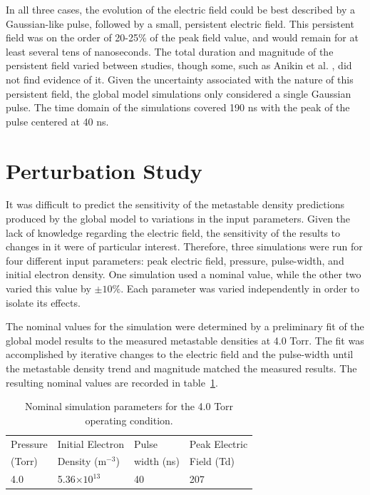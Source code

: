 In all three cases, the evolution of the electric field could be best described
by a Gaussian-like pulse, followed by a small, persistent electric field. This
persistent field was on the order of 20-25\% of the peak field value, and would
remain for at least several tens of nanoseconds. The total duration and
magnitude of the persistent field varied between studies, though some, such as
Anikin et al. \cite{Anikin1998}, did not find evidence of it. Given the
uncertainty associated with the nature of this persistent field, the global
model simulations only considered a single Gaussian pulse. The time domain of
the simulations covered 190 ns with the peak of the pulse centered at 40 ns.

\section{Perturbation Study}

It was difficult to predict the sensitivity of the metastable density
predictions produced by the global model to variations in the input parameters.
Given the lack of knowledge regarding the electric field, the sensitivity of the
results to changes in it were of particular interest. Therefore, three
simulations were run for four different input parameters: peak electric field,
pressure, pulse-width, and initial electron density. One simulation used a
nominal value, while the other two varied this value by $\pm10\%$. Each
parameter was varied independently in order to isolate its effects.

The nominal values for the simulation were determined by a preliminary fit of
the global model results to the measured metastable densities at 4.0 Torr. The
fit was accomplished by iterative changes to the electric field and the
pulse-width until the metastable density trend and magnitude matched the
measured results. The resulting nominal values are recorded in
table~\ref{tbl:nominal}.
\begin{table}
  \centering
  \caption{Nominal simulation parameters for the 4.0 Torr operating condition.}
  \begin{tabular}{llll}
    \toprule
    Pressure & Initial Electron    & Pulse      & Peak Electric \\
    (Torr)   & Density (m$^{-3}$)  & width (ns) & Field (Td)\\ 
    \midrule
    4.0      & 5.36$\times10^{13}$ & 40         & 207 \\
    \bottomrule
  \end{tabular}
  \label{tbl:nominal}
\end{table}


